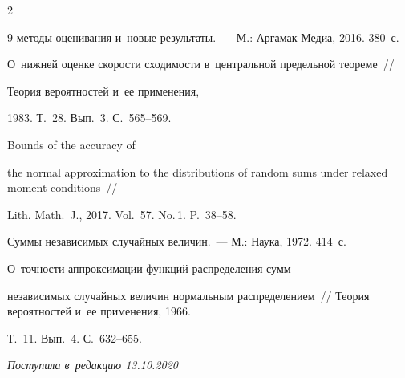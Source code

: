\begin{multicols}{2}
{{\begin{thebibliography}{9}
методы оценивания и~новые результаты.~--- М.: Аргамак-Медиа, 2016. 380~с.




 О~нижней оценке скорости сходимости в~центральной предельной теореме~// 

Теория вероятностей и~ее применения,

1983. Т.~28. Вып.~3. С.~565--569.




 Bounds of the accuracy of 

the normal approximation to the distributions of random sums under relaxed moment conditions~// 

Lith. Math.~J., 2017. Vol.~57. No.\,1. P.~38--58.




 Суммы независимых случайных величин.~--- М.: Наука, 1972. 414~с.








 О~точ\-ности аппроксимации функций распределения сумм 

независимых случайных величин нормальным распределением~// Теория вероятностей и~ее применения, 1966. 

Т.~11. Вып.~4. С.~632--655.

\end{thebibliography}



}

}



\end{multicols}



\vspace*{-3pt}



\hfill{\small\textit{Поступила в~редакцию 13.10.2020}}



